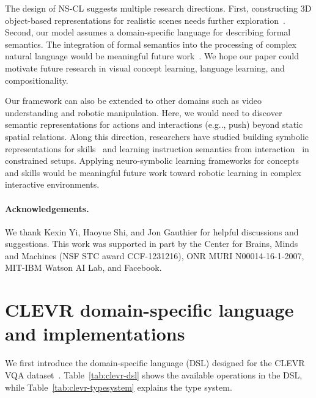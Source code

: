 \documentclass{article} \usepackage{iclr2019_conference,times}
\makeatletter
\newcommand{\tbl}[1]{Table~\ref{#1}}
\DeclareRobustCommand\onedot{\futurelet\@let@token\@onedot}
\def\@onedot{\ifx\@let@token.\else.\null\fi\xspace}
\def\eg{e.g\onedot} \def\Eg{E.g\onedot}
\newcommand{\model}{NS-CL\xspace}
\newcommand{\myparagraph}[1]{\vspace{-3pt}\paragraph{#1}}
\newcommand{\revisioncolor}{}
\makeatother
\begin{document}
{\revisioncolor
The design of \model suggests multiple research directions. First, constructing 3D object-based representations for realistic scenes needs further exploration~\citep{Anderson2017BottomUp,Baradel2018Object}. Second, our model assumes a domain-specific language for describing formal semantics. The integration of formal semantics into the processing of complex natural language would be meaningful future work~\citep{Artzi2013Weakly,Oh2017Zero}. We hope our paper could motivate future research in visual concept learning, language learning, and compositionality. 

Our framework can also be extended to other domains such as video understanding and robotic manipulation. Here, we would need to discover semantic representations for actions and interactions (\eg, push) beyond static spatial relations. Along this direction, researchers have studied building symbolic representations for skills~\citep{Konidaris2018Skills} and learning instruction semantics from interaction~\citep{Oh2017Zero} in constrained setups. Applying neuro-symbolic learning frameworks for concepts and skills would be meaningful future work toward robotic learning in complex interactive environments. }
\myparagraph{Acknowledgements.}
We thank Kexin Yi, Haoyue Shi, and Jon Gauthier for helpful discussions and suggestions. This work was supported in part by the Center for Brains, Minds and Machines (NSF STC award CCF-1231216), ONR MURI N00014-16-1-2007, MIT-IBM Watson AI Lab, and Facebook. 



\newpage

\appendix

\section{CLEVR domain-specific language and implementations}
\label{sec:app:dsl}
We first introduce the domain-specific language (DSL) designed for the CLEVR VQA dataset~\citep{Johnson2017CLEVR}. \tbl{tab:clevr-dsl} shows the available operations in the DSL, while \tbl{tab:clevr-typesystem} explains the type system.
\end{document}
